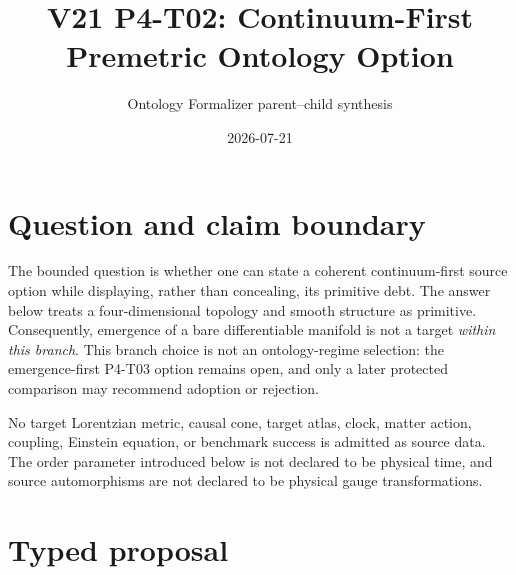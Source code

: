 \documentclass[11pt]{article}
\title{V21 P4-T02: Continuum-First Premetric Ontology Option}
\author{Ontology Formalizer parent--child synthesis}
\date{2026-07-21}
\begin{document}
\maketitle

\begin{center}
\end{center}

\section{Question and claim boundary}

The bounded question is whether one can state a coherent continuum-first
source option while displaying, rather than concealing, its primitive debt.
The answer below treats a four-dimensional topology and smooth structure as
primitive. Consequently, emergence of a bare differentiable manifold is not a
target \emph{within this branch}. This branch choice is not an ontology-regime
selection: the emergence-first P4-T03 option remains open, and only a later
protected comparison may recommend adoption or rejection.

No target Lorentzian metric, causal cone, target atlas, clock, matter action,
coupling, Einstein equation, or benchmark success is admitted as source data.
The order parameter introduced below is not declared to be physical time, and
source automorphisms are not declared to be physical gauge transformations.

\section{Typed proposal}
\end{document}
